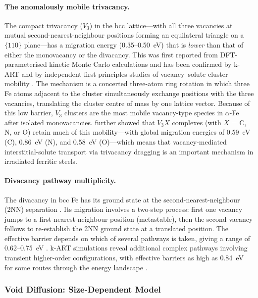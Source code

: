 \documentclass[pdflatex,sn-basic]{sn-jnl} %
\begin{document}
\paragraph{The anomalously mobile trivacancy.}
The compact trivacancy ($V_3$) in the bcc lattice---with all three vacancies
at mutual second-nearest-neighbour positions forming an equilateral triangle on
a $\{110\}$ plane---has a migration energy (0.35--0.50~eV) that is
\emph{lower} than that of either the monovacancy or the divacancy. This was
first reported from DFT-parameterised kinetic Monte Carlo calculations and
has been confirmed by k-ART \citep{Rahman2023} and by independent
first-principles studies of vacancy--solute cluster mobility
\citep{Schuler2015}. The mechanism is a concerted three-atom ring rotation in
which three Fe atoms adjacent to the cluster simultaneously exchange positions
with the three vacancies, translating the cluster centre of mass by one
lattice vector. Because of this low barrier, $V_3$ clusters are the most
mobile vacancy-type species in $\alpha$-Fe after isolated monovacancies.
\cite{Schuler2015} further showed that $V_3X$ complexes (with $X$ = C, N, or
O) retain much of this mobility---with global migration energies of 0.59~eV
(C), 0.86~eV (N), and 0.58~eV (O)---which means that vacancy-mediated
interstitial-solute transport via trivacancy dragging is an important
mechanism in irradiated ferritic steels.

\paragraph{Divacancy pathway multiplicity.}
The divacancy in bcc Fe has its ground state at the second-nearest-neighbour
(2NN) separation \citep{Domain2001}. Its migration involves a two-step process:
first one vacancy jumps to a first-nearest-neighbour position (metastable),
then the second vacancy follows to re-establish the 2NN ground state at a
translated position. The effective barrier depends on which of several
pathways is taken, giving a range of 0.62--0.75~eV
\citep{Rahman2023,Fu2005_vac}. k-ART simulations reveal additional complex
pathways involving transient higher-order configurations, with effective
barriers as high as 0.84~eV for some routes through the energy landscape
\citep{Rahman2023}.

\subsubsection{Void Diffusion: Size-Dependent Model}
\end{document}
